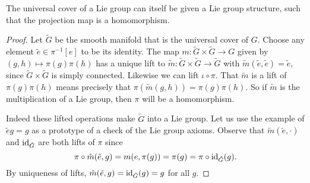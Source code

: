 \begin{theorem}
The universal cover of a Lie group can itself be given a Lie group structure, such that the projection map is a homomorphism.
\end{theorem}
\begin{proof}
Let $\tilde{G}$ be the smooth manifold that is the universal cover of $G$.
Choose any element $\tilde{e} \in \pi^{-1}[e]$ to be its identity.
The map $m : \tilde{G}\times\tilde{G} \to G$ given by $(g,h) \mapsto \pi(g)\pi(h)$ has a unique lift to $\tilde{m} : \tilde{G}\times\tilde{G} \to \tilde{G}$ with $\tilde{m}(\tilde{e},\tilde{e}) = \tilde{e}$, since $\tilde{G}\times\tilde{G}$ is simply connected.
Likewise we can lift $\iota \circ \pi$.
That $\tilde{m}$ is a lift of $\pi(g)\pi(h)$ means precisely that $\pi(\tilde{m}(g,h)) = \pi(g)\pi(h)$.
So if $\tilde{m}$ is the multiplication of a Lie group, then $\pi$ will be a homomorphism.

Indeed these lifted operations make $\tilde{G}$ into a Lie group.
Let us use the example of $\tilde{e}g = g$ as a prototype of a check of the Lie group axioms.
Observe that $\tilde{m}(\tilde{e},\cdot)$ and $\operatorname{id}_{\tilde{G}}$ are both lifts of $\pi$ since
\[
\pi \circ \tilde{m}(\tilde{e},g) 
= m(e,\pi(g))
= \pi(g)
= \pi \circ \operatorname{id}_{\tilde{G}}(g).
\]
By uniqueness of lifts, $\tilde{m}(\tilde{e},g) = \operatorname{id}_{\tilde{G}}(g) = g$ for all $g$.
\end{proof}



